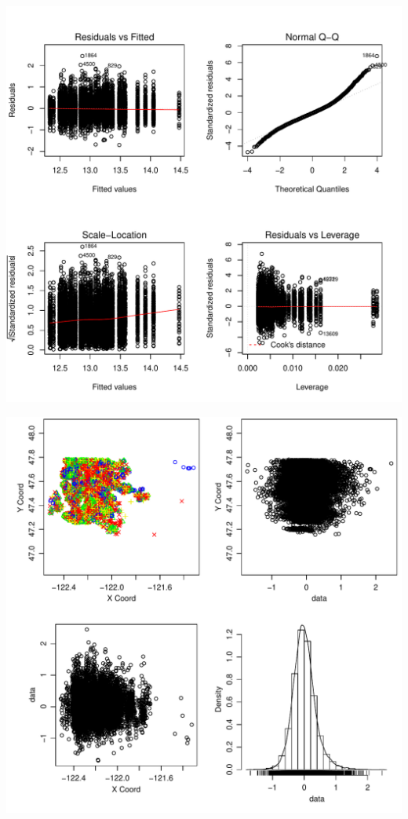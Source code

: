 \documentclass{article}\usepackage[]{graphicx}\usepackage[]{color}
\makeatletter
\def\maxwidth{ %
  \ifdim\Gin@nat@width>\linewidth
    \linewidth
  \else
    \Gin@nat@width
  \fi
}
\newenvironment{knitrout}{}{} %
\makeatother
\begin{document}
\begin{enumerate}
\begin{enumerate}
\begin{knitrout}
\color{fgcolor}
\includegraphics[width=\maxwidth]{figure/m1-1} 

\includegraphics[width=\maxwidth]{figure/m1-2} 


\end{knitrout}
\end{enumerate}
\end{enumerate}
\end{document}
